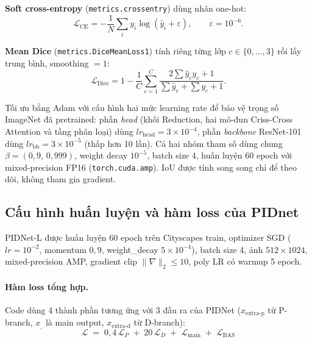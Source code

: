 \textbf{Soft cross-entropy} (\texttt{metrics.crossentry}) dùng nhãn one-hot:
\begin{equation}
  \mathcal{L}_{\mathrm{CE}} = -\frac{1}{N}\sum_{i} y_i \log(\hat{y}_i + \varepsilon),
  \qquad \varepsilon = 10^{-6}.
\end{equation}

\textbf{Mean Dice} (\texttt{metrics.DiceMeanLoss1}) tính riêng từng lớp $c \in \{0,\dots,3\}$ rồi lấy trung bình, smoothing $=1$:
\begin{equation}
  \mathcal{L}_{\mathrm{Dice}} = 1 - \frac{1}{C}\sum_{c=1}^{C}\frac{2\sum \hat{y}_c y_c + 1}{\sum \hat{y}_c + \sum y_c + 1}.
\end{equation}

Tối ưu bằng Adam với cấu hình hai mức learning rate để bảo vệ trọng số ImageNet đã pretrained: phần \textit{head} (khối Reduction, hai mô-đun Criss-Cross Attention và tầng phân loại) dùng $lr_\mathrm{head} = 3\!\times\!10^{-4}$, phần \textit{backbone} ResNet-101 dùng $lr_\mathrm{bb} = 3\!\times\!10^{-5}$ (thấp hơn 10 lần). Cả hai nhóm tham số dùng chung $\beta = (0{,}9,\,0{,}999)$, weight decay $10^{-5}$, batch size $4$, huấn luyện 60 epoch với mixed-precision FP16 (\texttt{torch.cuda.amp}). IoU được tính song song chỉ để theo dõi, không tham gia gradient.
 




\subsection{Cấu hình huấn luyện và hàm loss của PIDnet}
\label{sec:loss}

PIDNet-L được huấn luyện 60 epoch trên Cityscapes train, optimizer SGD ($lr=10^{-2}$, momentum $0{,}9$, weight\_decay $5\!\times\!10^{-4}$), batch size 4, ảnh $512\times1024$, mixed-precision AMP, gradient clip $\|\nabla\|_2 \le 10$, poly LR có warmup 5 epoch.

\paragraph{Hàm loss tổng hợp.} Code dùng 4 thành phần tương ứng với 3 đầu ra của PIDNet ($x_{\text{extra-p}}$ từ P-branch, $x_{\_}$ là main output, $x_{\text{extra-d}}$ từ D-branch):
\begin{equation}
  \mathcal{L} \;=\; 0{,}4\,\mathcal{L}_{P} \;+\; 20\,\mathcal{L}_{D} \;+\; \mathcal{L}_{\text{main}} \;+\; \mathcal{L}_{\text{BAS}}
  \label{eq:total_loss}
\end{equation}

